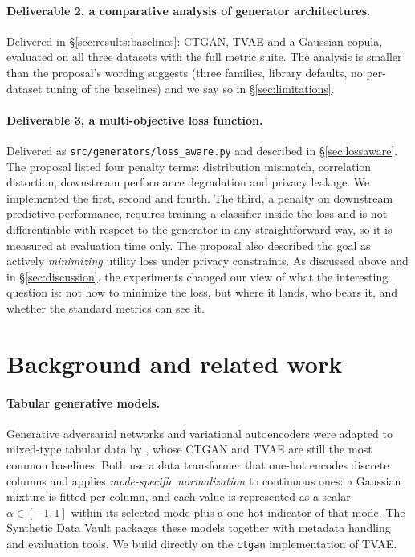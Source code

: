 \documentclass[11pt,a4paper]{article}
\begin{document}
\paragraph{Deliverable 2, a comparative analysis of generator architectures.}
Delivered in \S\ref{sec:results:baselines}: CTGAN, TVAE and a Gaussian
copula, evaluated on all three datasets with the full metric suite. The
analysis is smaller than the proposal's wording suggests (three families,
library defaults, no per-dataset tuning of the baselines) and we say so in
\S\ref{sec:limitations}.

\paragraph{Deliverable 3, a multi-objective loss function.} Delivered as
\texttt{src/generators/loss\_aware.py} and described in \S\ref{sec:lossaware}.
The proposal listed four penalty terms: distribution mismatch, correlation
distortion, downstream performance degradation and privacy leakage. We
implemented the first, second and fourth. The third, a penalty on downstream
predictive performance, requires training a classifier inside the loss and is
not differentiable with respect to the generator in any straightforward way,
so it is measured at evaluation time only. The proposal also described the goal
as actively \emph{minimizing} utility loss under privacy constraints. As
discussed above and in \S\ref{sec:discussion}, the experiments changed our
view of what the interesting question is: not how to minimize the loss, but
where it lands, who bears it, and whether the standard metrics can see it.

\section{Background and related work}
\label{sec:background}

\paragraph{Tabular generative models.}
Generative adversarial networks and variational autoencoders were adapted to
mixed-type tabular data by \citet{xu2019ctgan}, whose CTGAN and TVAE are still
the most common baselines. Both use a data transformer that one-hot encodes
discrete columns and applies \emph{mode-specific normalization} to continuous
ones: a Gaussian mixture is fitted per column, and each value is represented
as a scalar $\alpha \in [-1,1]$ within its selected mode plus a one-hot
indicator of that mode. The Synthetic Data Vault \citep{patki2016sdv}
packages these models together with metadata handling and evaluation tools. We
build directly on the \texttt{ctgan} implementation of TVAE.
\end{document}
